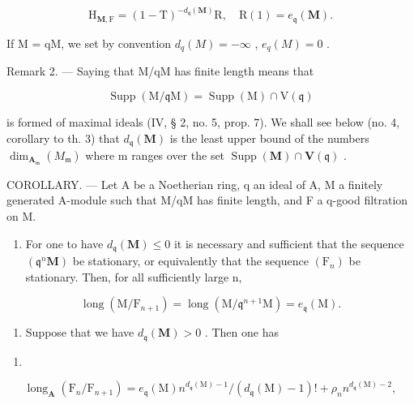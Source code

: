 \[
\mathrm{H} _ {\mathbf {M}, \mathrm{F}} = (1 - \mathrm{T}) ^ {- d _ {\mathfrak {q}} (\mathbf {M})} \mathrm{R}, \quad \mathrm{R} (1) = e _ {\mathfrak {q}} (\mathbf {M}).
\]

If M = qM, we set by convention \(d_{q}(M) = -\infty\) , \(e_{q}(M) = 0\) .

Remark 2. --- Saying that M/qM has finite length means that

\[
\operatorname{Supp} (\mathrm{M} / \mathfrak {q} \mathrm{M}) = \operatorname{Supp} (\mathrm{M}) \cap \mathrm{V} (\mathfrak {q})
\]

is formed of maximal ideals (IV, § 2, no. 5, prop. 7). We shall see below (no. 4, corollary to th. 3) that \(d_{\mathfrak{q}}(\mathbf{M})\) is the least upper bound of the numbers \(\dim_{\mathbf{A}_{\mathfrak{m}}}(M_{\mathfrak{m}})\) where m ranges over the set \(\operatorname{Supp}(\mathbf{M}) \cap \mathbf{V}(\mathfrak{q})\) .

COROLLARY. — Let A be a Noetherian ring, q an ideal of A, M a finitely generated A-module such that M/qM has finite length, and F a q-good filtration on M.

\begin{enumerate}
\def\labelenumi{\alph{enumi})}
\tightlist
\item
  For one to have \(d_{\mathfrak{q}}(\mathbf{M}) \leqslant 0\) it is necessary and sufficient that the sequence \((\mathfrak{q}^{n}\mathbf{M})\) be stationary, or equivalently that the sequence \((\mathrm{F}_{n})\) be stationary. Then, for all sufficiently large n,
\end{enumerate}

\[
\operatorname{long} \left(\mathrm{M} / \mathrm{F} _ {n + 1}\right) = \operatorname{long} \left(\mathrm{M} / \mathfrak {q} ^ {n + 1} \mathrm{M}\right) = e _ {\mathfrak {q}} (\mathrm{M}).
\]

\begin{enumerate}
\def\labelenumi{\alph{enumi})}
\setcounter{enumi}{1}
\tightlist
\item
  Suppose that we have \(d_{\mathfrak{q}}(\mathbf{M}) > 0\) . Then one has
\end{enumerate}

\begin{enumerate}
\def\labelenumi{(\arabic{enumi})}
\setcounter{enumi}{12}
\tightlist
\item
\end{enumerate}

\[
\operatorname{long} _ {\mathbf {A}} \left(\mathrm{F} _ {n} / \mathrm{F} _ {n + 1}\right) = e _ {\mathfrak {q}} (\mathrm{M}) n ^ {d _ {\mathfrak {q}} (\mathrm{M}) - 1} / \left(d _ {\mathfrak {q}} (\mathrm{M}) - 1\right)! + \rho_ {n} n ^ {d _ {\mathfrak {q}} (\mathrm{M}) - 2},\tag{14}
\]

